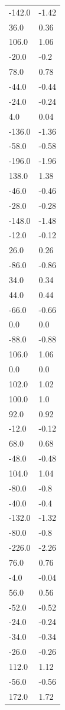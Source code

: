 \begin{longtable}{ll}
-142.0 & -1.42 \\
36.0 & 0.36 \\
106.0 & 1.06 \\
-20.0 & -0.2 \\
78.0 & 0.78 \\
-44.0 & -0.44 \\
-24.0 & -0.24 \\
4.0 & 0.04 \\
-136.0 & -1.36 \\
-58.0 & -0.58 \\
-196.0 & -1.96 \\
138.0 & 1.38 \\
-46.0 & -0.46 \\
-28.0 & -0.28 \\
-148.0 & -1.48 \\
-12.0 & -0.12 \\
26.0 & 0.26 \\
-86.0 & -0.86 \\
34.0 & 0.34 \\
44.0 & 0.44 \\
-66.0 & -0.66 \\
0.0 & 0.0 \\
-88.0 & -0.88 \\
106.0 & 1.06 \\
0.0 & 0.0 \\
102.0 & 1.02 \\
100.0 & 1.0 \\
92.0 & 0.92 \\
-12.0 & -0.12 \\
68.0 & 0.68 \\
-48.0 & -0.48 \\
104.0 & 1.04 \\
-80.0 & -0.8 \\
-40.0 & -0.4 \\
-132.0 & -1.32 \\
-80.0 & -0.8 \\
-226.0 & -2.26 \\
76.0 & 0.76 \\
-4.0 & -0.04 \\
56.0 & 0.56 \\
-52.0 & -0.52 \\
-24.0 & -0.24 \\
-34.0 & -0.34 \\
-26.0 & -0.26 \\
112.0 & 1.12 \\
-56.0 & -0.56 \\
172.0 & 1.72 \\

\end{longtable}

